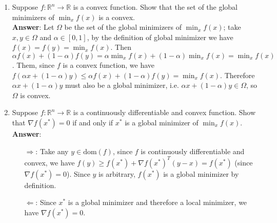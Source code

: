 \documentclass{article}
\begin{document}
\begin{enumerate}
\begin{enumerate}
            \end{enumerate}
      \item Suppose $f:\mathbb{R}^n\rightarrow\mathbb{R}$ is a convex function. Show that the set of the global minimizers of $\min_xf(x)$ is a convex.\\
            \textbf{Answer}: Let $\Omega$ be the set of the global minimizers of $\min_xf(x)$; take $x,y\in\Omega$ and $\alpha\in[0,1]$, by the definition of global minimizer we have $f(x)=f(y)=\min_xf(x)$. Then $\alpha f(x)+(1-\alpha) f(y)=\alpha\min_xf(x)+(1-\alpha)\min_xf(x)=\min_xf(x)$. Them, since $f$ is a convex function, we have $f(\alpha x+(1-\alpha)y)\leq\alpha f(x)+(1-\alpha) f(y)=\min_xf(x)$. Therefore $\alpha x+(1-\alpha)y$ must also be a global minimizer, i.e. $\alpha x+(1-\alpha)y\in\Omega$, so $\Omega$ is convex.
      \item Suppose $f:\mathbb{R}^n\rightarrow\mathbb{R}$ is a continuously differentiable and convex function. Show that $\nabla f(x^*)=0$ if and only if $x^*$ is a global minimizer of $\min_xf(x)$.\\
            \textbf{Answer}:
            \begin{itemize}
                  \item [$\Rightarrow$:] Take any $y\in\text{dom}(f)$, since $f$ is continuously differentiable and convex, we have $f(y)\geq f(x^*)+\nabla f(x^*)^T(y-x)=f(x^*)$ (since $\nabla f(x^*)=0$). Since $y$ is arbitrary, $f(x^*)$ is a global minimizer by definition.
                  \item [$\Leftarrow$:] Since $x^*$ is a global minimizer and therefore a local minimizer, we have $\nabla f(x^*)=0$.
            \end{itemize}
\end{enumerate}
\end{document}
